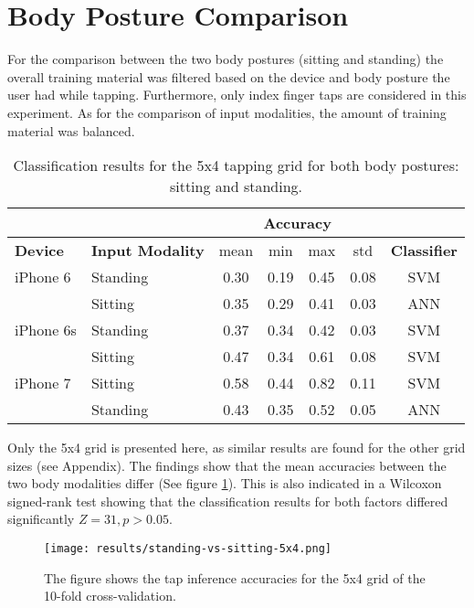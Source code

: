 \section{Body Posture Comparison}
For the comparison between the two body postures (sitting and standing) the overall training material was filtered based on the device and body posture the user had while tapping. Furthermore, only index finger taps are considered in this experiment. As for the comparison of input modalities, the amount of training material was balanced.

\begin{table}[h!]
  \centering
\begin{tabular}{|l|l|c|c|c|c|c|}
  \cline{3-6}
  \multicolumn{2}{c}{} & \multicolumn{4}{|c|}{\textbf{Accuracy}}  \\
  \hline
  \textbf{Device} & \textbf{Input Modality} & mean &   min &   max  & std &  \textbf{Classifier} \\
  \hline
  iPhone 6 & Standing &      0.30 &     0.19 &     0.45 &     0.08 &  SVM \\
  & Sitting &      0.35 &     0.29 &     0.41 &     0.03 &  ANN \\
  \hline
iPhone 6s   & Standing &      0.37 &     0.34 &     0.42 &     0.03 &  SVM \\
& Sitting &      0.47 &     0.34 &     0.61 &     0.08 &  SVM \\
  \hline
  iPhone 7 &    Sitting     &      0.58 &     0.44 &     0.82 &     0.11 &  SVM\\
  & Standing &      0.43 &     0.35 &     0.52 &     0.05 &  ANN \\
  \hline
\end{tabular}
  \caption{Classification results for the 5x4 tapping grid for both body postures: sitting and standing.}
\end{table}

Only the 5x4 grid is presented here, as similar results are found for the other grid sizes (see Appendix). The findings show that the mean accuracies between the two body modalities differ (See figure \ref{fig:bodypos5x4}). This is also indicated in a Wilcoxon signed-rank test showing that the classification results for both factors differed significantly $Z = 31, p > 0.05$.

\begin{figure}[h!]
  \centering
  \texttt{[image: results/standing-vs-sitting-5x4.png]}
  \caption{The figure shows the tap inference accuracies for the 5x4 grid of the 10-fold cross-validation.} \label{fig:bodypos5x4}
\end{figure}

